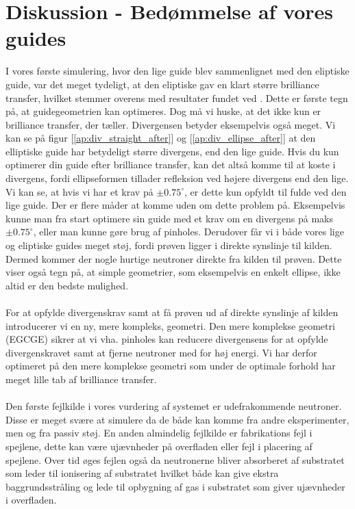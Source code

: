 \documentclass[12pt,oneside,a4paper]{article}
\begin{document}
{{{{{\section{Diskussion - Bedømmelse af vores guides}
I vores første simulering, hvor den lige guide blev sammenlignet med den eliptiske guide, var det meget tydeligt, at den eliptiske gav en klart større brilliance transfer, hvilket stemmer overens med resultater fundet ved \cite{Kleno201275}. Dette er første tegn på, at guidegeometrien kan optimeres. Dog må vi huske, at det ikke kun er brilliance transfer, der tæller. Divergensen betyder eksempelvis også meget. Vi kan se på figur [\ref{ap:div_straight_after}] og [\ref{ap:div_ellipse_after}] at den elliptiske guide har betydeligt større divergens, end den lige guide. Hvis du kun optimerer din guide efter brilliance transfer, kan det altså komme til at koste i divergens, fordi ellipseformen tillader refleksion ved højere divergens end den lige. Vi kan se, at hvis vi har et krav på $\pm 0.75^\circ$, er dette kun opfyldt til fulde ved den lige guide. Der er flere måder at komme uden om dette problem på. Eksempelvis kunne man fra start optimere sin guide med et krav om en divergens på maks  $\pm 0.75^\circ$, eller man kunne gøre brug af pinholes. Derudover får vi i både vores lige og eliptiske guides meget støj, fordi prøven ligger i direkte synslinje til kilden. Dermed kommer der nogle hurtige neutroner direkte fra kilden til prøven. Dette viser også tegn på, at simple geometrier, som eksempelvis en enkelt ellipse, ikke altid er den bedste mulighed.
\\
\\
For at opfylde divergenskrav samt at få prøven ud af direkte synslinje af kilden introducerer vi en ny, mere kompleks, geometri. Den mere komplekse geometri (EGCGE) sikrer at vi vha. pinholes kan reducere divergensens for at opfylde divergenskravet samt at fjerne neutroner med for høj energi. Vi har derfor optimeret på den mere komplekse geometri som under de optimale forhold har meget lille tab af brilliance transfer.
\\
\\
Den første fejlkilde i vores vurdering af systemet er udefrakommende neutroner. Disse er meget svære at simulere da de både kan komme fra andre eksperimenter, men og fra passiv støj. En anden almindelig fejlkilde er fabrikations fejl i spejlene, dette kan være ujævnheder på overfladen eller fejl i placering af spejlene. Over tid øges fejlen også da neutronerne bliver absorberet af substratet som leder til ionisering af substratet hvilket både kan give ekstra baggrundsstråling og lede til opbygning af gas i substratet som giver ujævnheder i overfladen.
}}}}}
\end{document}
